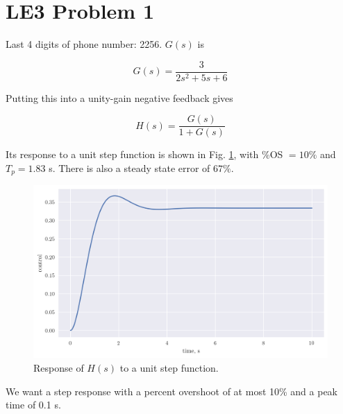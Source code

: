 \documentclass[12pt,a4paper]{article}
\begin{document}
\setcounter{page}{1}

\section*{LE3 Problem 1}
\bigskip

Last 4 digits of phone number: 2256. $G(s)$ is

\begin{equation}
	G(s) = \frac{3}{2s^2 + 5s + 6} \label{eq:gs}
\end{equation}

Putting this into a unity-gain negative feedback gives

\begin{equation}
	H(s) = \frac{G(s)}{1 + G(s)} \label{eq:hs}
\end{equation}

Its response to a unit step function is shown in Fig. \ref{fig:hs-step}, with \%OS $= 10\%$ and $T_p = 1.83$ s. There is also a steady state error of $67\%$.

\begin{figure}[h!]
	\centering
	\includegraphics[width=0.75\linewidth]{LE3_gs_step.png}
	\caption{Response of $H(s)$ to a unit step function.}
	\label{fig:hs-step}
\end{figure}

We want a step response with a percent overshoot of at most 10\% and a peak time of 0.1 s.
\end{document}
